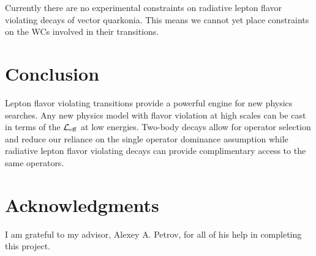 \documentclass[12pt]{article}
\begin{document}
Currently there are no experimental constraints on radiative lepton flavor violating decays of vector quarkonia.  This means we cannot yet place constraints on the WCs involved in their transitions.

\section{Conclusion} 

Lepton flavor violating transitions provide a powerful engine for new physics searches.  Any new physics model with flavor violation at high scales can be cast in terms of the ${\cal L}_{\rm eff}$ at low energies. Two-body decays allow for operator selection and reduce our reliance on the single operator dominance assumption while radiative lepton flavor violating decays can provide complimentary access to the same operators.

\section{Acknowledgments} 

I am grateful to my advisor, Alexey A. Petrov, for all of his help in completing this project.
\end{document}
